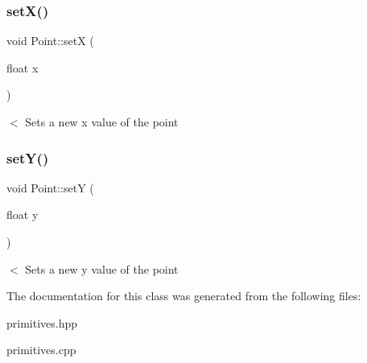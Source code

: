 \subsubsection{\texorpdfstring{set\+X()}{setX()}}
{\footnotesize\ttfamily void Point\+::setX (\begin{DoxyParamCaption}\item[{float}]{x }\end{DoxyParamCaption})}

$<$ Sets a new x value of the point \mbox{\label{classPoint_a18b8e100ef3ba704ac407cfc7451475c}} 
\subsubsection{\texorpdfstring{set\+Y()}{setY()}}
{\footnotesize\ttfamily void Point\+::setY (\begin{DoxyParamCaption}\item[{float}]{y }\end{DoxyParamCaption})}

$<$ Sets a new y value of the point 

The documentation for this class was generated from the following files\+:\begin{DoxyCompactItemize}
\item 
primitives.\+hpp\item 
primitives.\+cpp\end{DoxyCompactItemize}
